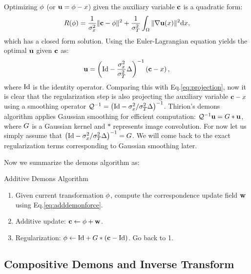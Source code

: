 \documentclass[letterpaper,12pt]{article}
\begin{document}
Optimizing $\phi$ (or $\mathbf{u} = \phi - x$) given the auxiliary variable $\mathbf{c}$ is a quadratic form: 
\begin{align}
R(\phi) = \frac{1}{\sigma_x^2} \|\mathbf{c} - \phi\|^2+\frac{1}{\sigma_T^2} \int_\Omega \| \nabla\mathbf{u}(x)\|^2 \text{d} x,
\end{align}
which has a closed form solution.  Using the Euler-Lagrangian equation yields the optimal $\mathbf{u}$ given $\mathbf{c}$ as:
\begin{align}
\mathbf{u} = \left( \text{Id} - \frac{\sigma_x^2}{\sigma_T^2} \Delta \right)^{-1} \left( \mathbf{c} - x \right),
\end{align}
where $\text{Id}$ is the identity operator. Comparing this with
Eq.\ref{eq:projection}, now it is clear that the regularization step
is also projecting the auxiliary variable $\mathbf{c}-x$ using a smoothing
operator  $\mathcal{Q}^{-1} = \left( \text{Id} - {\sigma_x^2}/{\sigma_T^2} \Delta \right)^{-1}$. 
Thirion's demons algorithm applies Gaussian smoothing for efficient
computation: $\mathcal{Q}^{-1} \mathbf{u} = {G} \ast \mathbf{u}$, where ${G}$ is a Gaussian
kernel and $\ast$ represents image convolution. For now let us simply
assume that $\left( \text{Id} - {\sigma_x^2}/{\sigma_T^2} \Delta \right)^{-1} =
{G}$.  We will come back to the exact regularization terms corresponding to Gaussian smoothing later.

Now we summarize the demons algorithm as:
\begin{algorithm}
\caption{Additive Demons Algorithm}
\label{alg:additivedemons}
\begin{enumerate}
\item{Given current transformation $\phi$, compute the correspondence update field $\mathbf{w}$ using Eq.\ref{eq:adddemonforce}. 
}
\item{Additive update: $\mathbf{c} \leftarrow \phi + \mathbf{w}$.
}
\item{Regularization: $\phi \leftarrow \text{Id} + {G} \ast (\mathbf{c} - \text{Id})$. Go back to 1.
}
\end{enumerate}
\end{algorithm}

\subsection{Compositive Demons and Inverse Transform}
\label{sec:compositivedemons}
\end{document}

